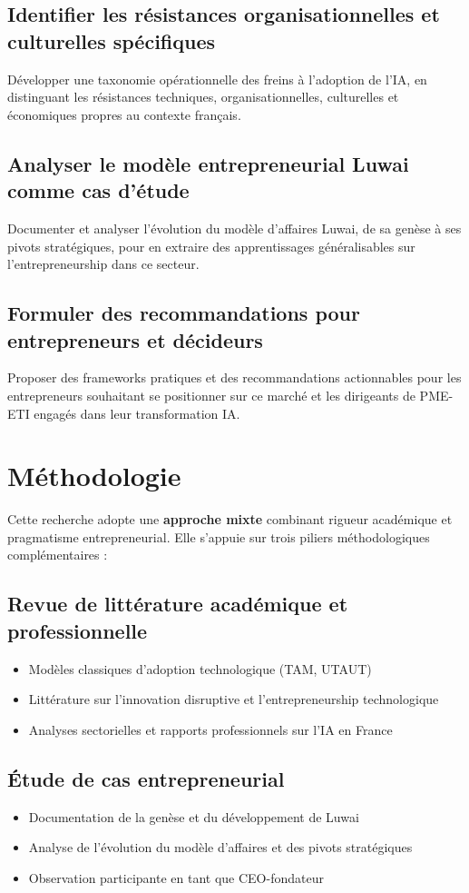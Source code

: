 \subsection{Identifier les résistances organisationnelles et culturelles spécifiques}
Développer une taxonomie opérationnelle des freins à l'adoption de l'IA, en distinguant les résistances techniques, organisationnelles, culturelles et économiques propres au contexte français.

\subsection{Analyser le modèle entrepreneurial Luwai comme cas d'étude}
Documenter et analyser l'évolution du modèle d'affaires Luwai, de sa genèse à ses pivots stratégiques, pour en extraire des apprentissages généralisables sur l'entrepreneurship dans ce secteur.

\subsection{Formuler des recommandations pour entrepreneurs et décideurs}
Proposer des frameworks pratiques et des recommandations actionnables pour les entrepreneurs souhaitant se positionner sur ce marché et les dirigeants de PME-ETI engagés dans leur transformation IA.

\section{Méthodologie}

Cette recherche adopte une \textbf{approche mixte} combinant rigueur académique et pragmatisme entrepreneurial. Elle s'appuie sur trois piliers méthodologiques complémentaires :

\subsection{Revue de littérature académique et professionnelle}
\begin{itemize}
    \item Modèles classiques d'adoption technologique (TAM, UTAUT)
    \item Littérature sur l'innovation disruptive et l'entrepreneurship technologique
    \item Analyses sectorielles et rapports professionnels sur l'IA en France
\end{itemize}

\subsection{Étude de cas entrepreneurial}
\begin{itemize}
    \item Documentation de la genèse et du développement de Luwai
    \item Analyse de l'évolution du modèle d'affaires et des pivots stratégiques
    \item Observation participante en tant que CEO-fondateur
\end{itemize}

